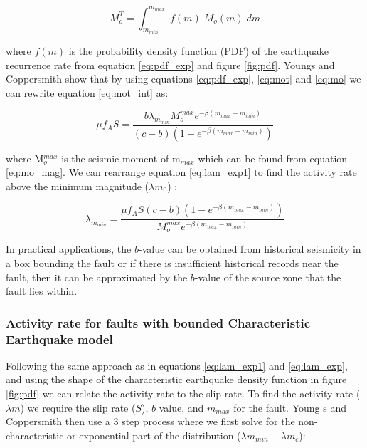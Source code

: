 \begin{enumerate}
\begin{equation} \label{eq:mot_int}
M_o^T = \int_{m_{min}}^{m_{max}} \; f(m) \; M_o(m) \; dm
\end{equation}

where $f(m)$ is the probability density function (PDF) of the earthquake recurrence rate from equation \ref{eq:pdf_exp} and figure \ref{fig:pdf}. 
Youngs and Coppersmith show that by using equations \ref{eq:pdf_exp}, \ref{eq:mot} and \ref{eq:mo} we can rewrite equation \ref{eq:mot_int} as:

\begin{equation} \label{eq:lam_exp1}
\mu f_A S= \frac{ b \lambda _{m_{min}} M_o^{max} e^{- \beta (m_{max} - m_{min} )} }  { (c - b) (1-e^{-\beta (m_{max} - m_{min}) })  }
\end{equation}

where M$_o^{max}$ is the seismic moment of m$_{max}$ which can be found from equation \ref{eq:mo_mag}. We can rearrange equation \ref{eq:lam_exp1} 
to find the activity rate above the minimum magnitude ($\lambda m_0$) :

\begin{equation} \label{eq:lam_exp}
\lambda _{m_{min}} = \frac{ \mu f_A S (c - b) (1-e^{-\beta (m_{max} - m_{min}) }) } { M_o^{max}  e^{- \beta (m_{max} - m_{min} )} }
\end{equation}

In practical applications, the $b$-value can be obtained from historical seismicity in a box bounding the fault \cite{schwartz1984,youngs1985} or if there is 
insufficient historical records near the fault, then it can be approximated by the $b$-value of the source zone that the fault lies within. 

\subsubsection{Activity rate for faults with bounded Characteristic Earthquake model} 
\label{sec:rv_flt_ch}

Following the same approach as in equations \ref{eq:lam_exp1} and  \ref{eq:lam_exp}, and using the shape of the characteristic 
earthquake density function in figure \ref{fig:pdf} we can relate the activity rate to the slip rate. To find the activity 
rate ($\lambda m$) we require the slip rate ($S$), $b$ value, and $m_{max}$ for the fault. Young s and Coppersmith then use 
a 3 step process where we first solve for the non-characteristic or exponential part of the distribution ($\lambda m_{min} - \lambda m_{c}$):


\end{enumerate}
